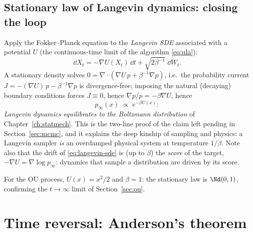 \subsection{Stationary law of Langevin dynamics: closing the loop}

Apply the Fokker--Planck equation to the \emph{Langevin SDE} associated
with a potential $U$ (the continuous-time limit of the algorithm
\eqref{eq:ula}):
\begin{equation}
  \dd X_t = -\nabla U(X_t)\,\dd t + \sqrt{2\beta^{-1}}\;\dd W_t .
  \label{eq:langevin-sde}
\end{equation}
A stationary density solves
$0 = \nabla \cdot ( \nabla U\, p + \beta^{-1} \nabla p )$, i.e.\ the
probability current $J = -(\nabla U)\,p - \beta^{-1}\nabla p$ is
divergence-free; imposing the natural (decaying) boundary conditions
forces $J \equiv 0$, hence $\nabla p / p = -\beta \nabla U$, hence
\begin{equation}
  p_\infty(x) \;\propto\; e^{-\beta U(x)} :
  \label{eq:langevin-boltzmann}
\end{equation}
\emph{Langevin dynamics equilibrates to the Boltzmann distribution} of
Chapter~\ref{ch:statmech}. This is the two-line proof of the claim left
pending in Section~\ref{sec:mcmc}, and it explains the deep kinship of
sampling and physics: a Langevin sampler \emph{is} an overdamped physical
system at temperature $1/\beta$. Note also that the drift of
\eqref{eq:langevin-sde} is (up to $\beta$) the \emph{score} of the
target, $-\nabla U = \nabla \log p_\infty$: dynamics that sample a
distribution are driven by its score.

For the OU process, $U(x) = x^2/2$ and $\beta = 1$: the stationary law is
$\Nd(0,1)$, confirming the $t \to \infty$ limit of Section~\ref{sec:ou}.

\section{Time reversal: Anderson's theorem}\label{sec:reversal}

